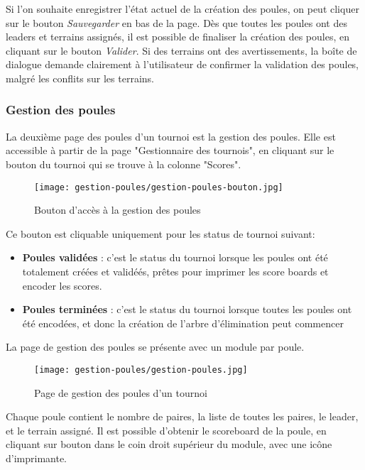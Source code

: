 Si l'on souhaite enregistrer l'état actuel de la création des poules, on peut cliquer sur le bouton \textit{Sauvegarder} en bas de la page. Dès que toutes les poules ont des leaders et terrains assignés, il est possible de finaliser la création des poules, en cliquant sur le bouton \textit{Valider}. Si des terrains ont des avertissements, la boîte de dialogue demande clairement à l'utilisateur de confirmer la validation des poules, malgré les conflits sur les terrains.

\subsubsection{Gestion des poules}

La deuxième page des poules d'un tournoi est la gestion des poules. Elle est accessible à partir de la page "Gestionnaire des tournois", en cliquant sur le bouton du tournoi qui se trouve à la colonne "Scores".

\begin{figure}[H]
\centering
\texttt{[image: gestion-poules/gestion-poules-bouton.jpg]}
\caption{Bouton d'accès à la gestion des poules}
\end{figure}

Ce bouton est cliquable uniquement pour les status de tournoi suivant:
\begin{itemize}
\item \textbf{Poules validées} : c'est le status du tournoi lorsque les poules ont été totalement créées et validéés, prêtes pour imprimer les score boards et encoder les scores.
\item \textbf{Poules terminées} : c'est le status du tournoi lorsque toutes les poules ont été encodées, et donc la création de l'arbre d'élimination peut commencer
\end{itemize}

La page de gestion des poules se présente avec un module par poule.

\begin{figure}[H]
\centering
\texttt{[image: gestion-poules/gestion-poules.jpg]}
\caption{Page de gestion des poules d'un tournoi}
\end{figure}

Chaque poule contient le nombre de paires, la liste de toutes les paires, le leader, et le terrain assigné. Il est possible d'obtenir le scoreboard de la poule, en cliquant sur bouton dans le coin droit supérieur du module, avec une icône d'imprimante.

